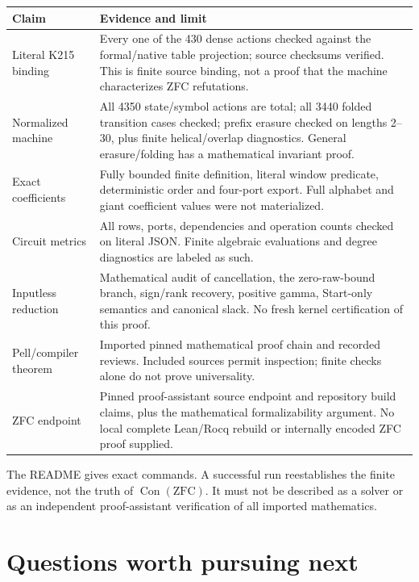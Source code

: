\documentclass[11pt]{article}
\newcommand{\Con}{\operatorname{Con}}
\begin{document}
\begin{longtable}{@{}p{}p{}@{}}
\toprule
Claim & Evidence and limit\\
\midrule
\endhead
Literal K215 binding & Every one of the 430 dense actions checked against the formal/native table projection; source checksums verified. This is finite source binding, not a proof that the machine characterizes ZFC refutations.\\
Normalized machine & All 4350 state/symbol actions are total; all 3440 folded transition cases checked; prefix erasure checked on lengths 2--30, plus finite helical/overlap diagnostics. General erasure/folding has a mathematical invariant proof.\\
Exact coefficients & Fully bounded finite definition, literal window predicate, deterministic order and four-port export. Full alphabet and giant coefficient values were not materialized.\\
Circuit metrics & All rows, ports, dependencies and operation counts checked on literal JSON. Finite algebraic evaluations and degree diagnostics are labeled as such.\\
Inputless reduction & Mathematical audit of cancellation, the zero-raw-bound branch, sign/rank recovery, positive gamma, Start-only semantics and canonical slack. No fresh kernel certification of this proof.\\
Pell/compiler theorem & Imported pinned mathematical proof chain and recorded reviews. Included sources permit inspection; finite checks alone do not prove universality.\\
ZFC endpoint & Pinned proof-assistant source endpoint and repository build claims, plus the mathematical formalizability argument. No local complete Lean/Rocq rebuild or internally encoded ZFC proof supplied.\\
\bottomrule
\end{longtable}

The README gives exact commands. A successful run reestablishes the finite evidence, not the truth of \(\Con(\mathrm{ZFC})\). It must not be described as a solver or as an independent proof-assistant verification of all imported mathematics.

\section{Questions worth pursuing next}
\end{document}
